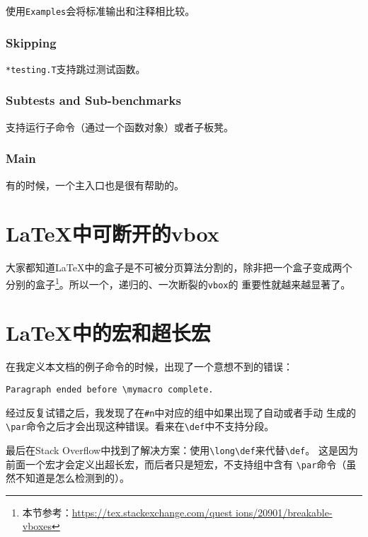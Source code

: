使用\verb|Examples|会将标准输出和注释相比较。

\subsubsection{Skipping}

\verb|*testing.T|支持跳过测试函数。

\subsubsection{Subtests and Sub-benchmarks}

支持运行子命令（通过一个函数对象）或者子板凳。

\subsubsection{Main}

有的时候，一个主入口也是很有帮助的。


\section{\LaTeX{}中可断开的vbox}

大家都知道\LaTeX{}中的盒子是不可被分页算法分割的，除非把一个盒子变成两个
分别的盒子\footnote{本节参考：\url{https://tex.stackexchange.com/quest
ions/20901/breakable-vboxes}}。所以一个，递归的、一次断裂的\verb|vbox|的
重要性就越来越显著了。


\section{\LaTeX{}中的宏和超长宏}

在我定义本文档的例子命令的时候，出现了一个意想不到的错误：
\begin{lstlisting}
Paragraph ended before \mymacro complete.
\end{lstlisting}

经过反复试错之后，我发现了在\verb|#n|中对应的组中如果出现了自动或者手动
生成的\verb|\par|命令之后才会出现这种错误。看来在\verb|\def|中不支持分段。

最后在Stack Overflow中找到了解决方案：使用\verb|\long\def|来代替\verb|\def|。
这是因为前面一个宏才会定义出超长宏，而后者只是短宏，不支持组中含有%
\verb|\par|命令（虽然不知道是怎么检测到的）。

